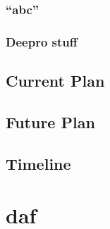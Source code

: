 \documentclass[firstyr, withindex, glossary]{cam-thesis}
\theoremstyle{definition}
\theoremstyle{remark}
\begin{document}
\subsection{``abc''}
\subsection{Deepro stuff}
\section{Current Plan}
\section{Future Plan}
\section{Timeline}
%

\renewcommand{\bibname}{Bibliography}
\cleardoublepage
{}
{}






\appendix



\chapter{daf}

\end{document}
